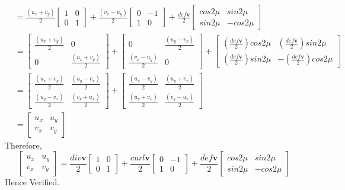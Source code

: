 \documentclass{article}
\begin{document}
\begin{align*}
  &= \frac{(u_x+v_y)}{2}\begin{bmatrix}1&0\\0&1\end{bmatrix}
+ \frac{(v_x - u_y)}{2}\begin{bmatrix}0&-1\\1&0\end{bmatrix}
+ \frac{def\mathbf{v}}{2}\begin{bmatrix} cos2\mu & sin2\mu \\ sin2\mu & -cos2\mu \end{bmatrix}
\\
  &= \begin{bmatrix}\frac{(u_x+v_y)}{2}&0\\0&\frac{(u_x+v_y)}{2}\end{bmatrix}
+ \begin{bmatrix}0&\frac{(u_y-v_x)}{2}\\\frac{(v_x - u_y)}{2}&0\end{bmatrix}
+ \begin{bmatrix}(\frac{def\mathbf{v}}{2})cos2\mu &(\frac{def\mathbf{v}}{2})sin2\mu \\
                  (\frac{def\mathbf{v}}{2})sin2\mu & -(\frac{def\mathbf{v}}{2})cos2\mu \end{bmatrix}
\\
  &= \begin{bmatrix} \frac{(u_x+v_y)}{2} &\frac{(u_y-v_x)}{2} \\
                  \frac{(u_y-v_x)}{2} &\frac{(v_y+u_x)}{2}\end{bmatrix}
+ \begin{bmatrix} \frac{(u_x-v_y)}{2} &\frac{(u_y+v_x)}{2} \\
                  \frac{(u_y+v_x)}{2} &\frac{(v_y-u_x)}{2}\end{bmatrix}
\\
 &= \begin{bmatrix} u_x & u_y \\ v_x & v_y \end{bmatrix}
\end{align*}
Therefore,
$$
\begin{bmatrix} u_x & u_y \\ v_x & v_y \end{bmatrix}
= \frac{div\mathbf{v}}{2}\begin{bmatrix}1&0\\0&1\end{bmatrix}
+ \frac{curl\mathbf{v}}{2}\begin{bmatrix}0&-1\\1&0\end{bmatrix}
+ \frac{def\mathbf{v}}{2}\begin{bmatrix} cos2\mu & sin2\mu \\ sin2\mu & -cos2\mu \end{bmatrix}
$$
Hence Verified.
\pagebreak
\end{document}
